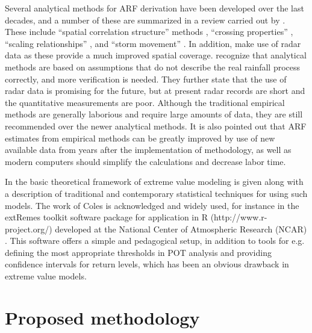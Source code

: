\documentclass[12pt,a4paper,english]{article}
\begin{document}
\clearpage
\newpage 

Several analytical methods for ARF derivation have been developed over the last decades, and a number of these are summarized in a review carried out by \cite{SvenssonandJones2010b}. These include ``spatial correlation structure'' methods \citep{RodriguezIturbeandMejia1974, SivapalanandBloschl1998, Omolayo1989}, ``crossing properties'' \citep{BacchiandRanzi1996}, ``scaling relationships'' \citep{deMicheleetal2001, VenezianoandLangousis2005}, and ``storm movement'' \citep{BengtssonandNiemczynowicz1986}. In addition, \cite{Durransetal2002, AllenandDeGaetano2005b, Lombardoetal2006} make use of radar data as these provide a much improved spatial coverage. \cite{SvenssonandJones2010b} recognize that analytical methods are based on assumptions that do not describe the real rainfall process correctly, and more verification is needed. They further state that the use of radar data is promising for the future, but at present radar records are short and the quantitative measurements are poor. Although the traditional empirical methods are generally laborious and require large amounts of data, they are still recommended over the newer analytical methods. It is also pointed out that ARF estimates from empirical methods can be greatly improved by use of new available data from years after the implementation of methodology, as well as modern computers should simplify the calculations and decrease labor time. 

In \cite{Coles2001} the basic theoretical framework of extreme value modeling is given along with a description of traditional and contemporary statistical techniques for using such models. The work of Coles is acknowledged and widely used, for instance in the extRemes toolkit software package for application in R (http://www.r-project.org/) developed at the National Center of Atmospheric Research (NCAR) \citep{Katzetal2005, GillelandandKatz2006}. This software offers a simple and pedagogical setup, in addition to tools for e.g. defining the most appropriate thresholds in POT analysis and providing confidence intervals for return levels, which has been an obvious drawback in extreme value models.

\section{Proposed methodology} 
\end{document}

